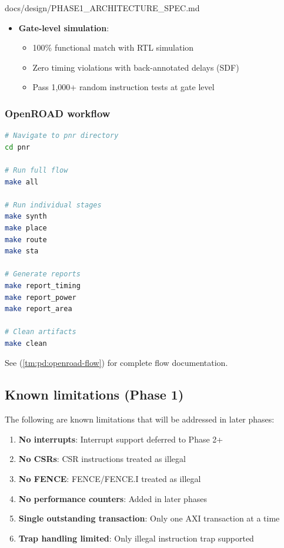 \begin{relocated}{docs/design/PHASE1_ARCHITECTURE_SPEC.md}
\begin{itemize}
  \begin{itemize}
  \tightlist
  \item
    DRC violations = 0
  \item
    LVS clean (layout matches netlist)
  \end{itemize}
\item
  \textbf{Gate-level simulation}:

  \begin{itemize}
  \tightlist
  \item
    100\% functional match with RTL simulation
  \item
    Zero timing violations with back-annotated delays (SDF)
  \item
    Pass 1,000+ random instruction tests at gate level
  \end{itemize}
\end{itemize}

\subsubsection{OpenROAD workflow}\label{ds:ch:phase1-architecture:openroad-workflow}

\begin{lstlisting}[language=bash]
# Navigate to pnr directory
cd pnr

# Run full flow
make all

# Run individual stages
make synth
make place
make route
make sta

# Generate reports
make report_timing
make report_power
make report_area

# Clean artifacts
make clean
\end{lstlisting}

See  (\cref{tm:pd:openroad-flow}) for complete flow
documentation.

\subsection{Known limitations (Phase 1)}\label{ds:ch:phase1-architecture:known-limitations-phase-1}

The following are known limitations that will be addressed in later
phases:

\begin{enumerate}
\def\labelenumi{\arabic{enumi}.}
\tightlist
\item
  \textbf{No interrupts}: Interrupt support deferred to Phase 2+
\item
  \textbf{No CSRs}: CSR instructions treated as illegal
\item
  \textbf{No FENCE}: FENCE/\allowbreak{}FENCE.I treated as illegal
\item
  \textbf{No performance counters}: Added in later phases
\item
  \textbf{Single outstanding transaction}: Only one AXI transaction at a
  time
\item
  \textbf{Trap handling limited}: Only illegal instruction trap
  supported
\end{enumerate}


\end{relocated}

